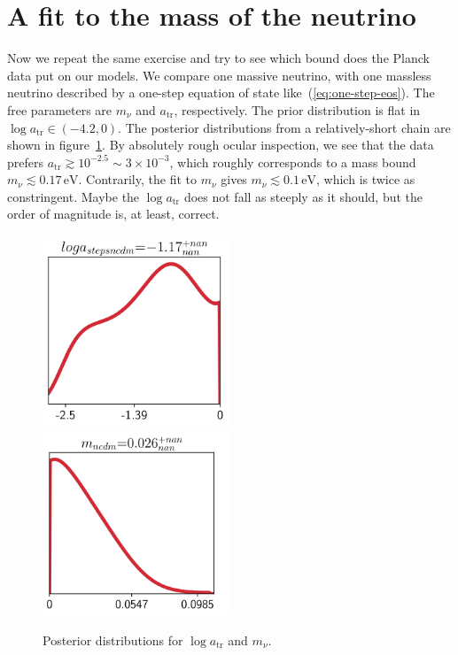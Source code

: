 \section{A fit to the mass of the neutrino}
Now we repeat the same exercise and try to see which bound does the Planck data put on our models. We compare one massive neutrino, with one massless neutrino described by a one-step equation of state like~(\ref{eq:one-step-eos}). The free parameters are $m_\nu$ and $a_{\mathrm{tr}}$, respectively. The prior distribution is flat in $\log a_{\mathrm{tr}}\in (-4.2,0)$. The posterior distributions from a relatively-short chain are shown in figure~\ref{fig:posteriors}. By absolutely rough ocular inspection, we see that the data prefers $a_{\mathrm{tr}}\gtrsim 10^{-2.5}\sim 3\times 10^{-3}$, which roughly corresponds to a mass bound $m_\nu \lesssim 0.17\, \mathrm{eV}$. Contrarily, the fit to $m_\nu$ gives $m_\nu \lesssim 0.1\, \mathrm{eV}$, which is twice as constringent. Maybe the $\log a_{\mathrm{tr}}$ does not fall as steeply as it should, but the order of magnitude is, at least, correct.
\begin{figure}
    \centering
    \includegraphics[width = 0.495\textwidth]{"Figures/posterior-onestep.png"}
    \includegraphics[width = 0.495\textwidth]{"Figures/posterior-mass.png"}
    \caption{Posterior distributions for $\log a_{\mathrm{tr}}$ and $m_\nu$.}
    \label{fig:posteriors}
\end{figure}


